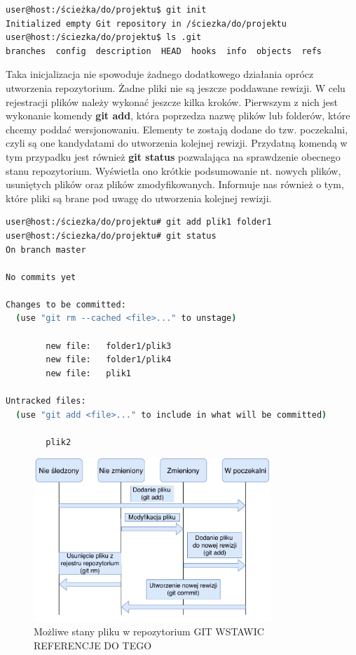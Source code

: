 \begin{lstlisting}[language=bash,caption={Inicjalizacja repozytorium git}]
user@host:/ścieżka/do/projektu$ git init
Initialized empty Git repository in /ściezka/do/projektu
user@host:/ściezka/do/projektu$ ls .git
branches  config  description  HEAD  hooks  info  objects  refs
\end{lstlisting}

Taka inicjalizacja nie spowoduje żadnego dodatkowego działania oprócz utworzenia repozytorium. Żadne pliki nie są jeszcze poddawane rewizji. W celu rejestracji plików należy wykonać jeszcze kilka kroków. Pierwszym z nich jest wykonanie komendy \textbf{git add}, która poprzedza nazwę plików lub folderów, które chcemy poddać wersjonowaniu. Elementy te zostają dodane do tzw. poczekalni, czyli są one kandydatami do utworzenia kolejnej rewizji. Przydatną komendą w tym przypadku jest również \textbf{git status} pozwalająca na sprawdzenie obecnego stanu repozytorium. Wyświetla ono krótkie podsumowanie nt. nowych plików, usuniętych plików oraz plików zmodyfikowanych. Informuje nas również o tym, które pliki są brane pod uwagę do utworzenia kolejnej rewizji.

\begin{lstlisting}[language=bash,caption={Dodawanie elementów do poczekalni}]
user@host:/ściezka/do/projektu# git add plik1 folder1
user@host:/ściezka/do/projektu# git status
On branch master

No commits yet

Changes to be committed:
  (use "git rm --cached <file>..." to unstage)

        new file:   folder1/plik3
        new file:   folder1/plik4
        new file:   plik1

Untracked files:
  (use "git add <file>..." to include in what will be committed)

        plik2
\end{lstlisting}

\begin{figure}[H]
\centering
\includegraphics[width=0.8\textwidth]{res/fileStates.pdf}
\caption{Możliwe stany pliku w repozytorium GIT WSTAWIC REFERENCJE DO TEGO} 
\end{figure}

